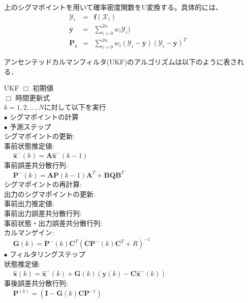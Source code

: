 \documentclass[twocolumn,oneside,a4paper]{article}
\begin{document}
上のシグマポイントを用いて確率密度関数をU変換する。具体的には、
\begin{eqnarray*}
	\mathscr{Y}_i &=& \bm{f}(\mathscr{X}_i) \\
	\bar{\bm{y}} &=& \sum_{i=0}^{2n} w_i \mathscr{Y}_i) \\
	\bm{P}_y &=& \sum_{i=0}^{2n} w_i (\mathscr{Y}_i - \bar{\bm{y}}) (\mathscr{Y}_i - \bar{\bm{y}})^{T}
\end{eqnarray*}


アンセンテッドカルマンフィルタ(UKF)のアルゴリズムは以下のように表される．

  \begin{itembox}[l]{UKF}
    $\Box$ 初期値\\

    $\Box$ 時間更新式\\
    $k=1,2,...,N$に対して以下を実行\\
     $\bullet$ シグマポイントの計算\\

     $\bullet$ 予測ステップ\\
     シグマポイントの更新: \\

     事前状態推定値: \\
     $\:\:\:\:\:\: \hat{\bm{x}}^{-}(k) = \bm{A}\hat{\bm{x}}^{-}(k-1)$\\
     事前誤差共分散行列: \\
     $\:\:\:\:\:\: \bm{P}^{-}(k)=\bm{A}\bm{P}(k-1)\bm{A}^{T}+\bm{BQ}\bm{B}^T$\\         
     シグマポイントの再計算: \\
     出力のシグマポイントの更新: \\
     事前出力推定値: \\
     事前出力誤差共分散行列: \\
     事前状態・出力誤差共分散行列: \\
     カルマンゲイン: \\
     $\:\:\:\:\:\: \bm{G}(k)=\bm{P}^{-}(k)\bm{C}^T(\bm{C}\bm{P}^{-}(k)\bm{C}^{T}+R)^{-1}$\\

     $\bullet$ フィルタリングステップ\\
     状態推定値: \\
     $\:\:\:\:\:\: \hat{\bm{x}}(k) = \hat{\bm{x}}^{-}(k) + \bm{G}(k)(\bm{y}(k)-\bm{C}\hat{\bm{x}}^{-}(k))$\\
     事後誤差共分散行列: \\
     $\:\:\:\:\:\: \bm{P}^(k)=(\bm{I}-\bm{G}(k)\bm{C}\bm{P}^{-1})$
  \end{itembox}
\end{document}
